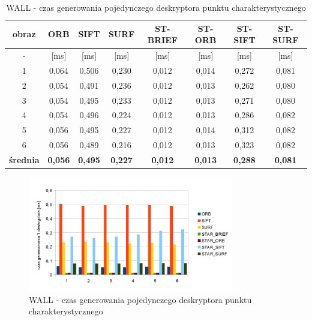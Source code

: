 \begin{table}[htbp]
  \centering
  \caption{WALL - czas generowania pojedynczego deskryptora punktu charakterystycznego}
    \begin{tabular}{|c|c|c|c|c|c|c|c|}\hline

    obraz & \textbf{ORB} & \textbf{SIFT} & \textbf{SURF} & \textbf{ST-BRIEF} & \textbf{ST-ORB} & \textbf{ST-SIFT} & \textbf{ST-SURF} \\\hline

    - & [ms] & [ms] & [ms] & [ms] & [ms] & [ms] & [ms] \\\hline
    1 & 0,064 & 0,506 & 0,230 & 0,012 & 0,014 & 0,272 & 0,081 \\
    2 & 0,054 & 0,491 & 0,236 & 0,012 & 0,013 & 0,262 & 0,080 \\
    3 & 0,054 & 0,495 & 0,233 & 0,012 & 0,013 & 0,271 & 0,080 \\
    4 & 0,054 & 0,496 & 0,224 & 0,012 & 0,013 & 0,286 & 0,082 \\
    5 & 0,056 & 0,495 & 0,227 & 0,012 & 0,014 & 0,312 & 0,082 \\
    6 & 0,056 & 0,489 & 0,216 & 0,012 & 0,013 & 0,323 & 0,082 \\\hline
    \textbf{średnia} & \textbf{0,056} & \textbf{0,495} & \textbf{0,227} & \textbf{0,012} & \textbf{0,013} & \textbf{0,288} & \textbf{0,081} \\\hline
    

    \end{tabular}%
  \label{tab:wall_f3}%
\end{table}%


\begin{figure}
\centering
\includegraphics[width=0.8\textwidth]{pict/mikolajczyk/wall/f3.png}
\caption{WALL - czas generowania pojedynczego deskryptora punktu charakterystycznego}
\label{fig:wall_f3}
\end{figure}


